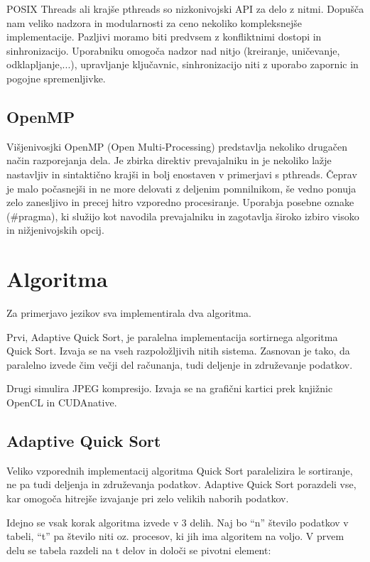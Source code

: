 \documentclass[journal,a4paper,twoside]{sty/IEEEtran}
\begin{document}
POSIX Threads ali krajše pthreads so nizkonivojski API za delo z nitmi. Dopušča nam veliko nadzora in modularnosti
za ceno nekoliko kompleksnejše implementacije. Pazljivi moramo biti predvsem z konfliktnimi dostopi
in sinhronizacijo. Uporabniku omogoča nadzor nad nitjo (kreiranje, uničevanje, odklapljanje,...), upravljanje ključavnic,
sinhronizacijo niti z uporabo zapornic in pogojne spremenljivke.

\subsection{OpenMP}

Višjenivosjki OpenMP (Open Multi-Processing) predstavlja nekoliko drugačen način razporejanja dela.
Je zbirka direktiv prevajalniku in je nekoliko lažje nastavljiv in sintaktično krajši in bolj enostaven 
v primerjavi s pthreads. Čeprav je malo počasnejši in ne more delovati z deljenim pomnilnikom,
še vedno ponuja zelo zanesljivo in precej hitro vzporedno procesiranje.
Uporabja posebne oznake (#pragma), ki služijo kot navodila prevajalniku in 
zagotavlja široko izbiro visoko in nižjenivojskih opcij.

\section{Algoritma}

Za primerjavo jezikov sva implementirala dva algoritma.

Prvi, Adaptive Quick Sort, je paralelna implementacija sortirnega algoritma Quick Sort.
Izvaja se na vseh razpoložljivih nitih sistema.
Zasnovan je tako, da paralelno izvede čim večji del računanja, tudi deljenje in združevanje podatkov.

Drugi simulira JPEG kompresijo.
Izvaja se na grafični kartici prek knjižnic OpenCL in CUDAnative.

\subsection{Adaptive Quick Sort}

Veliko vzporednih implementacij algoritma Quick Sort paralelizira le sortiranje, ne pa tudi deljenja in združevanja podatkov.
Adaptive Quick Sort porazdeli vse, kar omogoča hitrejše izvajanje pri zelo velikih naborih podatkov.

Idejno se vsak korak algoritma izvede v 3 delih.
Naj bo “n” število podatkov v tabeli, “t” pa število niti oz. procesov, ki jih ima algoritem na voljo.
V prvem delu se tabela razdeli na t delov in določi se pivotni element:
\end{document}
